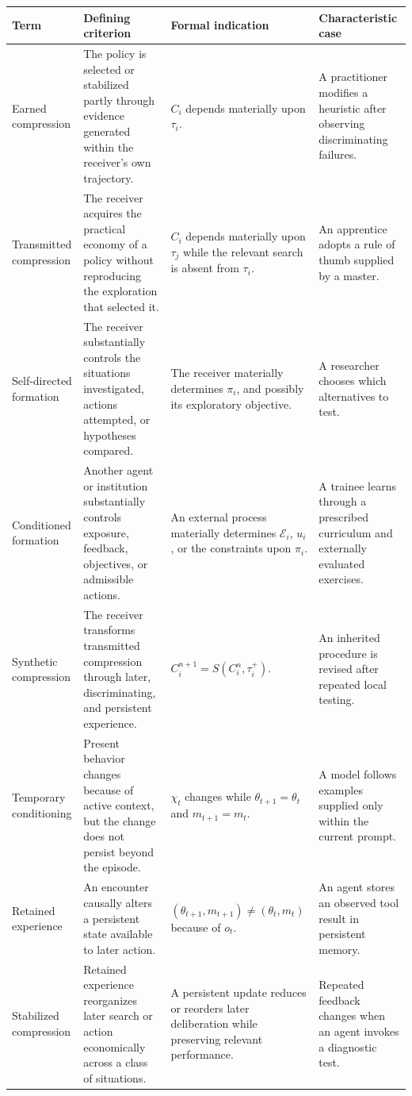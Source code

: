 \documentclass[11pt]{article}
\begin{document}
\begin{center}
\renewcommand{\arraystretch}{1.35}
\begin{tabular}{>{\raggedright\arraybackslash}p{}
                >{\raggedright\arraybackslash}p{}
                >{\raggedright\arraybackslash}p{}
                >{\raggedright\arraybackslash}p{}}
\toprule
\textbf{Term}
&
\textbf{Defining criterion}
&
\textbf{Formal indication}
&
\textbf{Characteristic case}
\\
\midrule
Earned compression
&
The policy is selected or stabilized partly through evidence generated within the receiver's own trajectory.
&
$C_i$ depends materially upon $\tau_i$.
&
A practitioner modifies a heuristic after observing discriminating failures.
\\
Transmitted compression
&
The receiver acquires the practical economy of a policy without reproducing the exploration that selected it.
&
$C_i$ depends materially upon $\tau_j$ while the relevant search is absent from $\tau_i$.
&
An apprentice adopts a rule of thumb supplied by a master.
\\
Self-directed formation
&
The receiver substantially controls the situations investigated, actions attempted, or hypotheses compared.
&
The receiver materially determines $\pi_i$, and possibly its exploratory objective.
&
A researcher chooses which alternatives to test.
\\
Conditioned formation
&
Another agent or institution substantially controls exposure, feedback, objectives, or admissible actions.
&
An external process materially determines $\mathcal{E}_i$, $u_i$, or the constraints upon $\pi_i$.
&
A trainee learns through a prescribed curriculum and externally evaluated exercises.
\\
Synthetic compression
&
The receiver transforms transmitted compression through later, discriminating, and persistent experience.
&
$C_i^{n+1}=S(C_i^n,\tau_i^{+})$.
&
An inherited procedure is revised after repeated local testing.
\\
Temporary conditioning
&
Present behavior changes because of active context, but the change does not persist beyond the episode.
&
$\chi_t$ changes while $\theta_{t+1}=\theta_t$ and $m_{t+1}=m_t$.
&
A model follows examples supplied only within the current prompt.
\\
Retained experience
&
An encounter causally alters a persistent state available to later action.
&
$(\theta_{t+1},m_{t+1})\neq(\theta_t,m_t)$ because of $o_t$.
&
An agent stores an observed tool result in persistent memory.
\\
Stabilized compression
&
Retained experience reorganizes later search or action economically across a class of situations.
&
A persistent update reduces or reorders later deliberation while preserving relevant performance.
&
Repeated feedback changes when an agent invokes a diagnostic test.
\\
\bottomrule
\end{tabular}
\end{center}
\end{document}
